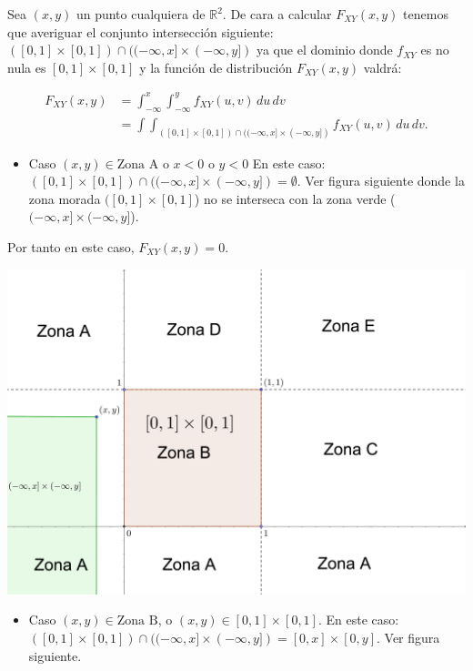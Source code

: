 \documentclass[]{book}
\providecommand{\tightlist}{%
  \setlength{\itemsep}{0pt}\setlength{\parskip}{0pt}}
\begin{document}
Sea \((x,y)\) un punto cualquiera de \(\mathbb{R}^2\). De cara a calcular \(F_{XY}(x,y)\) tenemos que averiguar el conjunto intersección siguiente: \(([0,1]\times [0,1])\cap ((-\infty,x]\times (-\infty,y])\) ya que el dominio donde \(f_{XY}\) es no nula es \([0,1]\times [0,1]\) y la función de distribución \(F_{XY}(x,y)\) valdrá:

\[
\begin{array}{rl}
F_{XY}(x,y)&=\int_{-\infty}^x\int_{-\infty}^y f_{XY}(u,v)\,du\,dv\\ &=
\int\int_{([0,1]\times [0,1])\cap ((-\infty,x]\times (-\infty,y])} f_{XY}(u,v)\,du\,dv.
\end{array}
\]

\begin{itemize}
\tightlist
\item
  Caso \((x,y)\in \mbox{Zona A}\) o \(x<0\) o \(y<0\) En este caso: \(([0,1]\times [0,1])\cap ((-\infty,x]\times (-\infty,y])=\emptyset.\) Ver figura siguiente donde la zona morada \(([0,1]\times [0,1]\)) no se interseca con la zona verde (\((-\infty,x]\times (-\infty,y]\)).
\end{itemize}

Por tanto en este caso, \(F_{XY}(x,y)=0\).

\includegraphics{Images/VaUniformeBidi3.png}

\begin{itemize}
\tightlist
\item
  Caso \((x,y)\in \mbox{Zona B}\), o \((x,y)\in [0,1]\times [0,1]\). En este caso: \(([0,1]\times [0,1])\cap ((-\infty,x]\times (-\infty,y])=[0,x]\times [0,y].\) Ver figura siguiente.
\end{itemize}
\end{document}
